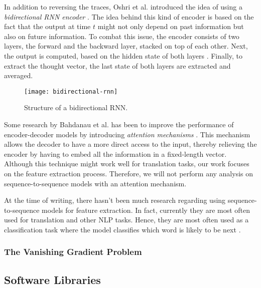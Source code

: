 In addition to reversing the traces, Oshri et al. introduced the idea of using a \textit{bidirectional RNN encoder} \cite{rnnencoder}.
The idea behind this kind of encoder is based on the fact that the output at time $t$ might not only depend on past information but also on future information.
To combat this issue, the encoder consists of two layers, the forward and the backward layer, stacked on top of each other.
Next, the output is computed, based on the hidden state of both layers \cite{britz_2016}.
Finally, to extract the thought vector, the last state of both layers are extracted and averaged.

\begin{figure}[h]
  \centering
  \texttt{[image: bidirectional-rnn]}
  \caption{Structure of a bidirectional RNN. \cite{britz_2016}}
  \label{fig:bidirectional-rnn}
\end{figure}

\newpage

Some research by Bahdanau et al. has been to improve the performance of encoder-decoder models by introducing \textit{attention mechanisms} \cite{attention_mechanisms}.
This mechanism allows the decoder to have a more direct access to the input, thereby relieving the encoder by having to embed all the information in a fixed-length vector.
Although this technique might work well for translation tasks, our work focuses on the feature extraction process.
Therefore, we will not perform any analysis on sequence-to-sequence models with an attention mechanism.

At the time of writing, there hasn't been much research regarding using sequence-to-sequence models for feature extraction.
In fact, currently they are most often used for translation and other NLP tasks.
Hence, they are most often used as a classification task where the model classifies which word is likely to be next \cite{tensorflowseq2seq,cho2014learning,rnnencoder,sutskever_vinyals_le}.

\subsubsection{The Vanishing Gradient Problem}



\subsection{Software Libraries}
